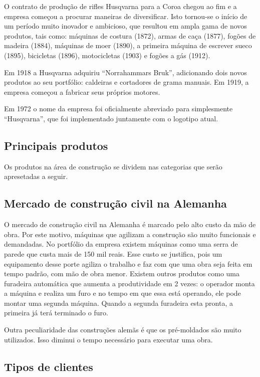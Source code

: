 \documentclass[12pt]{article}
\begin{document}
	O contrato de produção de rifles Husqvarna para a Coroa chegou ao fim e a empresa começou a procurar maneiras de diversificar. Isto tornou-se o início de um período muito inovador e ambicioso, que resultou em ampla gama de novos produtos, tais como: máquinas de costura (1872), armas de caça (1877), fogões de madeira (1884), máquinas de moer (1890), a primeira máquina de escrever sueco (1895), bicicletas (1896), motocicletas (1903) e fogões a gás (1912).

	Em 1918 a Husqvarna adquiriu “Norrahammars Bruk”, adicionando dois novos produtos ao seu portfólio: caldeiras e cortadores de grama manuais. Em 1919, a empresa começou a fabricar seus próprios motores.

	Em 1972 o nome da empresa foi oficialmente abreviado para simplesmente “Husqvarna”, que foi implementado juntamente com o logotipo atual.

\subsection{Principais produtos}

	Os produtos na área de construção se dividem nas categorias que serão apresetadas a seguir.

\subsection{Mercado de construção civil na Alemanha}

	O mercado de construção civil na Alemanha é marcado pelo alto custo da mão de obra. Por este motivo, máquinas que agilizam a construção são muito funcionais e demandadas. No portfólio da empresa existem máquinas como uma serra de parede que custa mais de 150 mil reais. Esse custo se justifica, pois um equipamento desse porte agiliza o trabalho e faz com que uma obra seja feita em tempo padrão, com mão de obra menor. Existem outros produtos como uma furadeira automática que aumenta a produtividade em 2 vezes: o operador monta a máquina e realiza um furo e no tempo em que essa está operando, ele pode montar uma segunda máquina. Quando a segunda furadeira esta pronta, a primeira já terá terminado o furo.

	Outra peculiaridade das construções alemãs é que os pré-moldados são muito utilizados. Isso diminui o tempo necessário para executar uma obra.

\subsection{Tipos de clientes}
\end{document}
